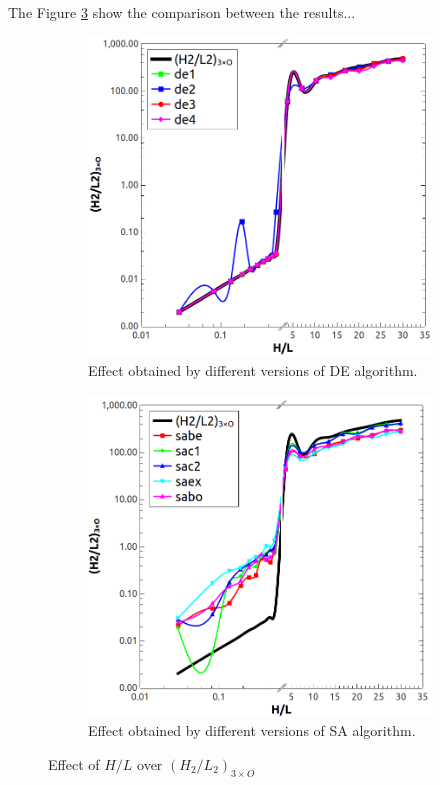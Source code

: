 \documentclass[10pt,fleqn,a4paper,twoside]{article}
\begin{document}
The Figure \ref{figure06} show the comparison between the results...

\begin{figure}[h!]
\centering
	\begin{subfigure}{0.52\textwidth}
		\centering
		\includegraphics[width=1\linewidth]{imgs/5dof/de/g_hl_h2l2_1.png}
		\caption{ {\small Effect obtained by different versions of DE algorithm.}}
		\label{figure06:sub1}
	\end{subfigure}%
	\begin{subfigure}{0.52\textwidth}
		\centering
		\includegraphics[width=1\linewidth]{imgs/5dof/sa/g_hl_h2l2_1.png}
		\caption{ {\small Effect obtained by different versions of SA algorithm.}}
		\label{figure06:sub2}
	\end{subfigure}%
\caption{Effect of $H/L$ over ${(H_{2}/L_{2})_{3\times O}}$}
\label{figure06}
\end{figure}
\end{document}
